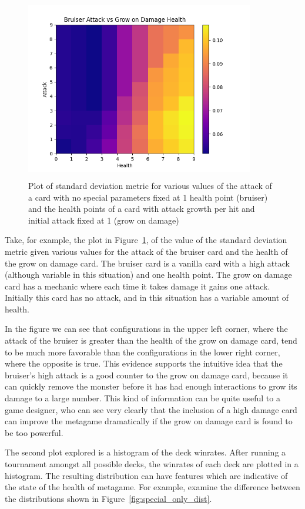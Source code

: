 \begin{figure}[t]
	\includegraphics[width=10cm, height=8cm]{bruiser_vs_grow} 
	\caption{Plot of standard deviation metric for various values of the attack of a card with no special parameters fixed at 1 health point (bruiser) and the health points of a card with attack growth per hit and initial attack fixed at 1 (grow on damage)}
	\label{fig:bruiser_vs_grow}
\end{figure}

Take, for example, the plot in Figure~\ref{fig:bruiser_vs_grow}, of the value of the standard deviation metric given various values for the attack of the bruiser card and the health of the grow on damage card. The bruiser card is a vanilla card with a high attack (although variable in this situation) and one health point. The grow on damage card has a mechanic where each time it takes damage it gains one attack. Initially this card has no attack, and in this situation has a variable amount of health. 

In the figure we can see that configurations in the upper left corner, where the attack of the bruiser is greater than the health of the grow on damage card, tend to be much more favorable than the configurations in the lower right corner, where the opposite is true. This evidence supports the intuitive idea that the bruiser's high attack is a good counter to the grow on damage card, because it can quickly remove the monster before it has had enough interactions to grow its damage to a large number. This kind of information can be quite useful to a game designer, who can see very clearly that the inclusion of a high damage card can improve the metagame dramatically if the grow on damage card is found to be too powerful.

The second plot explored is a histogram of the deck winrates. After running a tournament amongst all possible decks, the winrates of each deck are plotted in a histogram. The resulting distribution can have features which are indicative of the state of the health of metagame. For example, examine the difference between the distributions shown in Figure~\ref{fig:special_only_dist}. 

